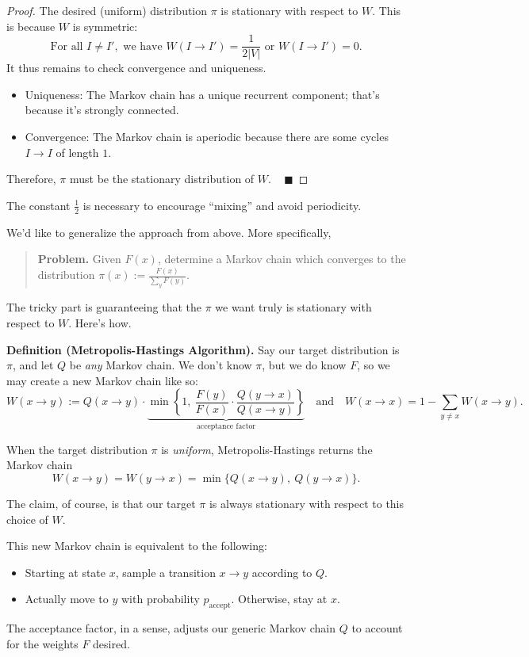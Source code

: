 \begin{proof}
The desired (uniform) distribution $\pi$ is stationary with respect to $W$.  This is because $W$ is symmetric:
\[ \text{For all } I \neq I', \text{ we have } W(I \to I') = \frac{1}{2 |V|} \text{ or } W(I \to I') = 0. \]
It thus remains to check convergence and uniqueness.
\begin{itemize}
    \item Uniqueness: The Markov chain has a unique recurrent component; that's because it's strongly connected.
    \item Convergence: The Markov chain is aperiodic because there are some cycles $I \to I$ of length $1$.
\end{itemize}
Therefore, $\pi$ must be the stationary distribution of $W$. ~ $\blacksquare$
\end{proof}

\begin{remark}
    The constant $\frac{1}{2}$ is necessary to encourage ``mixing'' and avoid periodicity.
\end{remark}

We'd like to generalize the approach from above.  More specifically,
\begin{quote}
    \textbf{Problem.} Given $F(x)$, determine a Markov chain which converges to the distribution $\pi(x) := \frac{F(x)}{\sum_y F(y)}$.
\end{quote}
The tricky part is guaranteeing that the $\pi$ we want truly is stationary with respect to $W$.  Here's how.

\textbf{Definition (Metropolis-Hastings Algorithm).} Say our target distribution is $\pi$, and let $Q$ be \emph{any} Markov chain.  We don't know $\pi$, but we do know $F$, so we may create a new Markov chain like so:
\[ W(x \to y) := Q(x \to y) \cdot \underbrace{\min \left \{ 1, \ \dfrac{F(y)}{F(x)} \cdot \dfrac{Q(y \to x)}{Q(x \to y)} \right \}}_{\text{acceptance factor}} ~~~ \text{ and } ~~~ W(x \to x) = 1 - \sum_{y \neq x} W(x \to y). \]
\begin{remark}
    When the target distribution $\pi$ is \emph{uniform}, Metropolis-Hastings returns the Markov chain
    \[ W(x \to y) = W(y \to x) = \min \{ Q(x \to y), \ Q(y \to x)\}. \]
\end{remark}
The claim, of course, is that our target $\pi$ is always stationary with respect to this choice of $W$.

\begin{remark}
This new Markov chain is equivalent to the following:
\begin{itemize}
    \item Starting at state $x$, sample a transition $x \to y$ according to $Q$.
    \item Actually move to $y$ with probability $p_{\text{accept}}$.  Otherwise, stay at $x$.
\end{itemize}
The acceptance factor, in a sense, adjusts our generic Markov chain $Q$ to account for the weights $F$ desired.
\end{remark}

